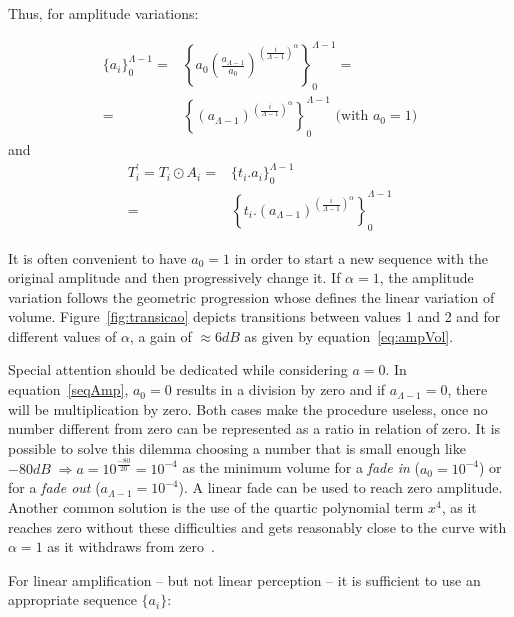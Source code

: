 \documentclass[
 aip,
 jmp,
 amsmath,amssymb,
 reprint,
]{revtex4-1}
\begin{document}
Thus, for amplitude variations:

\begin{equation}\label{seqAmp}
\begin{split}
 \{a_i\}_0^{\Lambda-1}= & \left \{ a_0 \left ( \frac{a_{\Lambda-1}}{a_0} \right )^{\left ( \frac{i}{\Lambda-1} \right )^\alpha} \right \}_0^{\Lambda-1}= \\ = & \left \{ \left ( {a_{\Lambda-1}} \right )^{\left ( \frac{i}{\Lambda-1} \right )^\alpha} \right \}_0^{\Lambda-1} \text{ (with } a_0=1 \text{)}
\end{split}
\end{equation}
and
\begin{equation}\label{transAmp}
\begin{split}
 T_i^{'}=T_i \odot A_i = & \{t_i . a_i\}_0^{\Lambda-1} \\ = & \left \{ t_i . (a_{\Lambda-1} )^{\left ( \frac{i}{\Lambda-1} \right )^\alpha} \right \}_0^{\Lambda-1}
\end{split}
\end{equation}

It is often convenient to have $a_0=1$ in order to start a new sequence with the original amplitude and then progressively change it.
If $\alpha=1$, the amplitude variation follows the geometric progression whose defines the linear variation of volume. Figure~\ref{fig:transicao} depicts transitions between values 1 and 2 and for different values of $\alpha$, a gain of $\approx 6dB$ as given by equation~\ref{eq:ampVol}.

Special attention should be dedicated while considering $a=0$.
In equation~\ref{seqAmp}, $a_0=0$ results in a division by zero and if $a_{\Lambda-1}=0$, there will be multiplication by zero. Both cases make the procedure useless, once no number different from zero can be represented as a ratio in relation of zero. It is possible to solve this dilemma choosing a number that is small enough like $-80dB\;\Rightarrow a=10^{\frac{-80}{20}}=10^{-4}$ as the minimum volume for a \emph{fade in} ($a_0=10^{-4}$) or for a \emph{fade out} ($a_{\Lambda-1}=10^{-4}$). A linear fade can be used to reach zero amplitude. Another common solution is the use of the quartic polynomial term $x^4$, as it reaches zero without these difficulties and gets reasonably close to the curve with $\alpha=1$ as it withdraws from zero~\cite{Cook}.

For linear amplification -- but not linear perception -- it is sufficient to use an appropriate sequence $\{a_i\}$:
\end{document}
